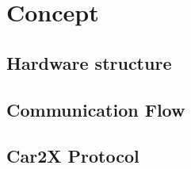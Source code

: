 \chapter{Concept}

\section{Hardware structure}


\section{Communication Flow}


\section{Car2X Protocol}